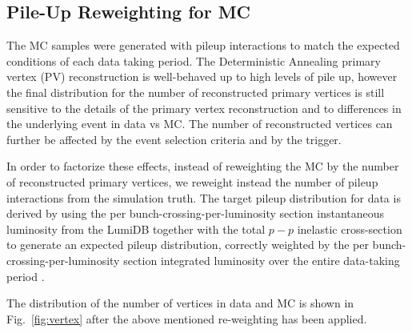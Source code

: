 
\subsection{Pile-Up Reweighting for MC}

The MC samples were generated with pileup interactions to match the expected conditions of each data taking period.
The Deterministic Annealing primary vertex (PV) reconstruction is well-behaved up to high levels of pile up, however the final distribution for the number of reconstructed primary vertices is still sensitive to the details of the primary vertex reconstruction and to differences in the underlying event in data vs MC. The number of reconstructed vertices can further be affected by the event selection criteria and by the trigger.

In order to factorize these effects, instead of reweighting the MC by the number of reconstructed primary vertices, we reweight instead the number of pileup interactions from the simulation truth. The target pileup distribution for data is derived by using the per bunch-crossing-per-luminosity section instantaneous luminosity from the LumiDB together with the total $p-p$ inelastic cross-section to generate an expected pileup distribution, correctly weighted by the  per bunch-crossing-per-luminosity section integrated luminosity over the entire data-taking period \cite{pileup}.

The distribution of the number of vertices in data and MC is shown in Fig.~\ref{fig:vertex} after the above mentioned re-weighting has been applied.

